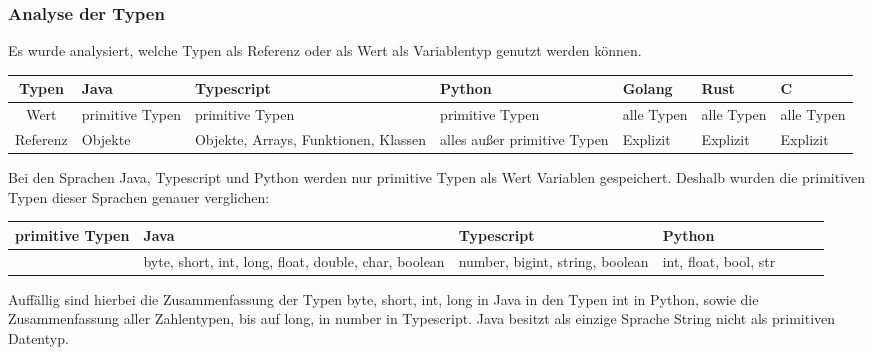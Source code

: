\documentclass[./einleitung.tex]{subfiles}
\begin{document}
    \subsubsection{Analyse der Typen}
    Es wurde analysiert, welche Typen als Referenz oder als Wert als Variablentyp genutzt werden können.
    \begin{center}
        \begin{tabular}{| c || m{4em} | m{5em} | m{5em} | m{4.5em} | m{4.5em} | m{4.5em} |}
            \hline
            Typen    & Java            & Typescript                           & Python                      & Golang     & Rust       & C          \\
            \hline
            Wert     & primitive Typen & primitive Typen                      & primitive Typen             & alle Typen & alle Typen & alle Typen \\
            \hline
            Referenz & Objekte         & Objekte, Arrays, Funktionen, Klassen & alles außer primitive Typen & Explizit & Explizit & Explizit \\
            \hline
        \end{tabular}
    \end{center}
    Bei den Sprachen Java, Typescript und Python werden nur primitive Typen als Wert Variablen gespeichert.
    Deshalb wurden die primitiven Typen dieser Sprachen genauer verglichen:
    \begin{center}
        \begin{tabular}{| c || m{7em} | m{7em} | m{7em} | m{4.5em} | m{4.5em} | m{4.5em} |}
            \hline
            primitive Typen & Java & Typescript & Python \\
            \hline
            & byte, short, int, long, float, double, char, boolean
            & number, bigint, string, boolean
            & int, float, bool, str \\
            \hline
        \end{tabular}
    \end{center}
    Auffällig sind hierbei die Zusammenfassung der Typen byte, short, int, long in Java in den Typen int in Python, sowie die Zusammenfassung aller Zahlentypen, bis auf long, in number in Typescript.
    Java besitzt als einzige Sprache String nicht als primitiven Datentyp.
\end{document}
